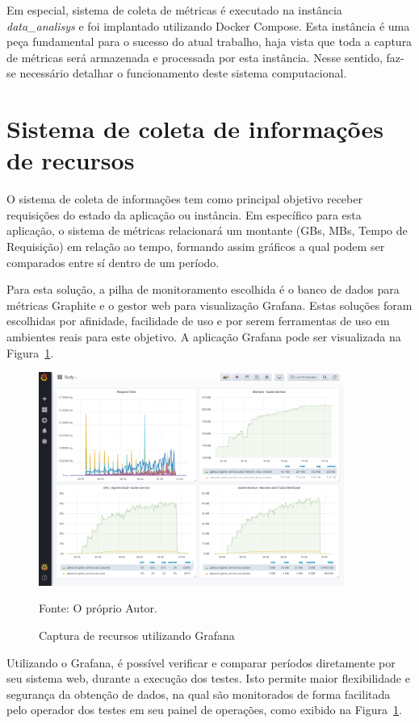 Em especial, sistema de coleta de métricas é executado na instância \textit{data\_analisys} e foi implantado utilizando Docker Compose. Esta instância é uma peça fundamental para o sucesso do atual trabalho, haja vista que toda a captura de métricas será armazenada e processada por esta instância.
%
Nesse sentido, faz-se necessário detalhar o funcionamento deste sistema computacional.


\section{Sistema de coleta de informações de recursos}
\label{sec:informacoes}

O sistema de coleta de informações tem como principal objetivo receber requisições do estado da aplicação ou instância.
%
Em específico para esta aplicação, o sistema de métricas relacionará um montante (GBs, MBs, Tempo de Requisição) em relação ao tempo, formando assim gráficos a qual podem ser comparados entre sí dentro de um período.

Para esta solução, a pilha de monitoramento escolhida é o banco de dados para métricas Graphite e o gestor web para visualização Grafana.
%
Estas soluções foram escolhidas por afinidade, facilidade de uso e por serem ferramentas de uso em ambientes reais para este objetivo.
%
A aplicação Grafana pode ser visualizada na Figura~\ref{fig:grafana}.


\begin{figure}[htb!]
    \caption{Captura de recursos utilizando Grafana}
    \label{fig:grafana}
    \includegraphics[height=7.0cm]{img/cap5/web.png}
    \centering

    Fonte: O próprio Autor.
\end{figure}

Utilizando o Grafana, é possível verificar e comparar períodos diretamente por seu sistema web, durante a execução dos testes.
%
Isto permite maior flexibilidade e segurança da obtenção de dados, na qual são monitorados de forma facilitada pelo operador dos testes em seu painel de operações, como exibido na Figura~\ref{fig:grafana}.

